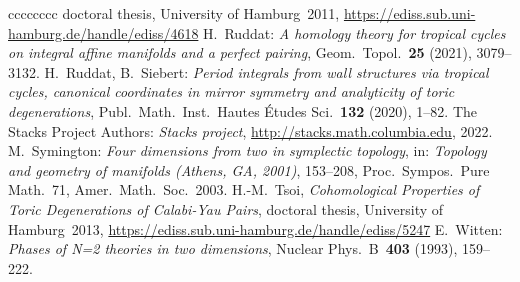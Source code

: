 \documentclass[11pt,letter]{amsart}
\theoremstyle{definition}
\theoremstyle{remark}
\numberwithin{equation}{section}
\numberwithin{figure}{section}
\begin{document}
\begin{thebibliography}{cccccccc}
	doctoral thesis, University of Hamburg~2011,
	\href{https://ediss.sub.uni-hamburg.de/handle/ediss/4618}{
	https://ediss.sub.uni-hamburg.de/handle/ediss/4618}
 H.\ Ruddat:
	\emph{A homology theory for tropical cycles on integral affine manifolds
	and a perfect pairing},
	Geom.\ Topol.~\textbf{25} (2021), 3079--3132.
 H.\ Ruddat, B.\ Siebert:
	\emph{Period integrals from wall structures via tropical cycles, canonical
	coordinates in mirror symmetry and analyticity of toric degenerations},
	Publ.\ Math.\ Inst.\ Hautes \'Etudes Sci.~\textbf{132} (2020), 1--82. 
	The {Stacks Project Authors}:
	\emph{\itshape Stacks project},
	\url{http://stacks.math.columbia.edu}, 2022.
 M.\ Symington:
	\emph{Four dimensions from two in symplectic topology},
	in: \textsl{Topology and geometry of manifolds (Athens, GA, 2001)},
	153--208, Proc.\ Sympos.\ Pure Math.~71, Amer.\ Math.\ Soc.~2003.
 H.-M.\ Tsoi,
	\emph{Cohomological Properties of Toric Degenerations of Calabi-Yau Pairs},
	doctoral thesis, University of Hamburg~2013,
	\href{https://ediss.sub.uni-hamburg.de/handle/ediss/5247}{%
	https://ediss.sub.uni-hamburg.de/handle/ediss/5247}
 E.\ Witten:
	\emph{Phases of N=2 theories in two dimensions},
	Nuclear Phys.~B~\textbf{403} (1993), 159--222.
\end{thebibliography}
\end{document}
